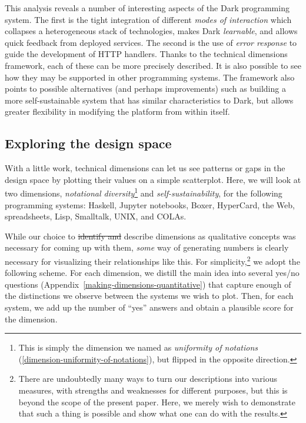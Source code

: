 \documentclass[english,submission]{programming}
\providecommand{\DIFdel}[1]{{\protect\color{red}\sout{#1}}}                      %
\providecommand{\DIFdelbegin}{} %
\providecommand{\DIFdelend}{} %
\begin{document}
This analysis reveals a number of interesting aspects of the Dark
programming system. The first is the tight integration of different
\emph{modes of interaction} which collapses a heterogeneous stack of
technologies, makes Dark \emph{learnable}, and allows quick feedback
from deployed services. The second is the use of \emph{error response}
to guide the development of HTTP handlers. Thanks to the technical
dimensions framework, each of these can be more precisely described. It
is also possible to see how they may be supported in other programming
systems. The framework also points to possible alternatives (and perhaps
improvements) such as building a more self-sustainable system that has
similar characteristics to Dark, but allows greater flexibility in
modifying the platform from within itself.

\hypertarget{exploring-the-design-space}{%
\subsection{Exploring the design
space}\label{exploring-the-design-space}}

With a little work, technical dimensions can let us see patterns or gaps
in the design space by plotting their values on a simple scatterplot.
Here, we will look at two dimensions, \emph{notational
diversity}\footnote{This is simply the dimension we named as
  \emph{uniformity of notations}
  (\ref{dimension-uniformity-of-notations}), but flipped in the opposite
  direction.} and \emph{self-sustainability}, for the following
programming systems: Haskell, Jupyter notebooks, Boxer, HyperCard, the
Web, spreadsheets, Lisp, Smalltalk, UNIX, and COLAs.

While our choice to \DIFdelbegin \DIFdel{identify and }\DIFdelend describe dimensions as qualitative concepts was
necessary for coming up with them, \emph{some} way of generating numbers
is clearly necessary for visualizing their relationships like this. For
simplicity,\footnote{There are undoubtedly many ways to turn our
  descriptions into various measures, with strengths and weaknesses for
  different purposes, but this is beyond the scope of the present paper.
  Here, we merely wish to demonstrate that such a thing is possible and
  show what one can do with the results.} we adopt the following scheme.
For each dimension, we distill the main idea into several yes/no
questions (Appendix~\ref{making-dimensions-quantitative}) that capture
enough of the distinctions we observe between the systems we wish to
plot. Then, for each system, we add up the number of ``yes'' answers and
obtain a plausible score for the dimension.
\end{document}
